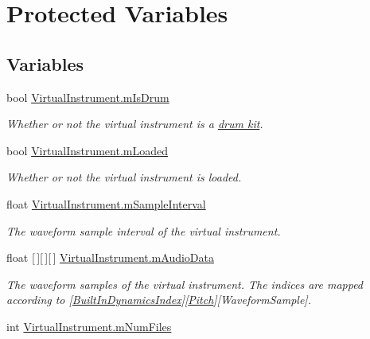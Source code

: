 \hypertarget{group___v_i_base_pro_var}{}\section{Protected Variables}
\label{group___v_i_base_pro_var}
\subsection*{Variables}
\begin{DoxyCompactItemize}
\item 
bool \hyperlink{group___v_i_base_pro_var_ga47dbd8aa02ab32b8f802adfd2d3d81de}{Virtual\+Instrument.\+m\+Is\+Drum}
\begin{DoxyCompactList}\small\item\em Whether or not the virtual instrument is a \hyperlink{class_drum_kit}{drum kit}. \end{DoxyCompactList}\item 
bool \hyperlink{group___v_i_base_pro_var_ga8978807d1878db5aae91fbd057c46097}{Virtual\+Instrument.\+m\+Loaded}
\begin{DoxyCompactList}\small\item\em Whether or not the virtual instrument is loaded. \end{DoxyCompactList}\item 
float \hyperlink{group___v_i_base_pro_var_ga20c1d3d25ea666378d72c833d160ae2e}{Virtual\+Instrument.\+m\+Sample\+Interval}
\begin{DoxyCompactList}\small\item\em The waveform sample interval of the virtual instrument. \end{DoxyCompactList}\item 
float \mbox{[}$\,$\mbox{]}\mbox{[}$\,$\mbox{]}\mbox{[}$\,$\mbox{]} \hyperlink{group___v_i_base_pro_var_ga52e76d9b74408660584676035a92a2c6}{Virtual\+Instrument.\+m\+Audio\+Data}
\begin{DoxyCompactList}\small\item\em The waveform samples of the virtual instrument. The indices are mapped according to \mbox{[}\hyperlink{group___audio_DefBID}{Built\+In\+Dynamics\+Index}\mbox{]}\mbox{[}\hyperlink{group___music_enums_ga508f69b199ea518f935486c990edac1d}{Pitch}\mbox{]}\mbox{[}Waveform\+Sample\mbox{]}. \end{DoxyCompactList}\item 
int \hyperlink{group___v_i_base_pro_var_ga9a602db8c9833ce75d95dd453c27d341}{Virtual\+Instrument.\+m\+Num\+Files}

\end{DoxyCompactItemize}
